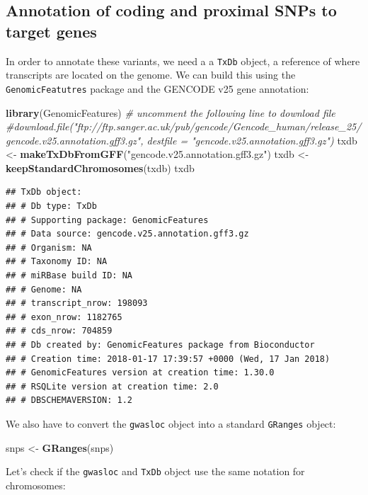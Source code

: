 \documentclass[9pt,a4paper,]{extarticle}
\newenvironment{Shaded}{\begin{snugshade}}{\end{snugshade}}
\newcommand{\KeywordTok}[1]{\textcolor[rgb]{0.13,0.29,0.53}{\textbf{#1}}}
\newcommand{\StringTok}[1]{\textcolor[rgb]{0.31,0.60,0.02}{#1}}
\newcommand{\CommentTok}[1]{\textcolor[rgb]{0.56,0.35,0.01}{\textit{#1}}}
\newcommand{\NormalTok}[1]{#1}
\begin{document}
\subsection{Annotation of coding and proximal SNPs to target genes}\label{annotation-of-coding-and-proximal-snps-to-target-genes}

In order to annotate these variants, we need a a \texttt{TxDb} object, a reference of where transcripts are located on the genome.
We can build this using the \texttt{GenomicFeatutres} \citep{Lawrence2013} package and the GENCODE v25 gene annotation:

\begin{Shaded}
\begin{Highlighting}[]
\KeywordTok{library}\NormalTok{(GenomicFeatures)}
\CommentTok{# uncomment the following line to download file}
\CommentTok{#download.file("ftp://ftp.sanger.ac.uk/pub/gencode/Gencode_human/release_25/gencode.v25.annotation.gff3.gz", destfile = "gencode.v25.annotation.gff3.gz")}
\NormalTok{txdb <-}\StringTok{ }\KeywordTok{makeTxDbFromGFF}\NormalTok{(}\StringTok{"gencode.v25.annotation.gff3.gz"}\NormalTok{)}
\NormalTok{txdb <-}\StringTok{ }\KeywordTok{keepStandardChromosomes}\NormalTok{(txdb)}
\NormalTok{txdb}
\end{Highlighting}
\end{Shaded}

\begin{verbatim}
## TxDb object:
## # Db type: TxDb
## # Supporting package: GenomicFeatures
## # Data source: gencode.v25.annotation.gff3.gz
## # Organism: NA
## # Taxonomy ID: NA
## # miRBase build ID: NA
## # Genome: NA
## # transcript_nrow: 198093
## # exon_nrow: 1182765
## # cds_nrow: 704859
## # Db created by: GenomicFeatures package from Bioconductor
## # Creation time: 2018-01-17 17:39:57 +0000 (Wed, 17 Jan 2018)
## # GenomicFeatures version at creation time: 1.30.0
## # RSQLite version at creation time: 2.0
## # DBSCHEMAVERSION: 1.2
\end{verbatim}

We also have to convert the \texttt{gwasloc} object into a standard \texttt{GRanges} object:

\begin{Shaded}
\begin{Highlighting}[]
\NormalTok{snps <-}\StringTok{ }\KeywordTok{GRanges}\NormalTok{(snps)}
\end{Highlighting}
\end{Shaded}

Let's check if the \texttt{gwasloc} and \texttt{TxDb} object use the same notation for chromosomes:
\end{document}
